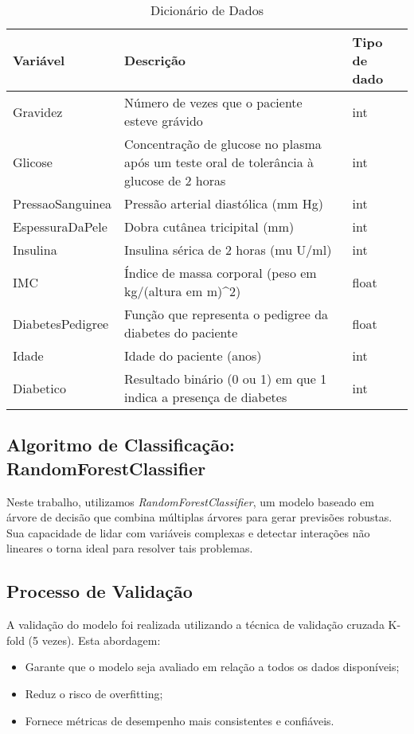 \documentclass[a4paper,12pt]{article}
\begin{document}
\begin{table}[H]
    \centering
    \caption{Dicionário de Dados}
    \begin{tabular}{|p{3cm}|p{7cm}|p{3cm}|}
        \hline
        \textbf{Variável} & \textbf{Descrição} & \textbf{Tipo de dado} \\
        \hline
        Gravidez & Número de vezes que o paciente esteve grávido & int \\
        \hline
        Glicose & Concentração de glucose no plasma após um teste oral de tolerância à glucose de 2 horas & int \\
        \hline
        PressaoSanguinea & Pressão arterial diastólica (mm Hg) & int \\
        \hline
        EspessuraDaPele & Dobra cutânea tricipital (mm) & int \\
        \hline
        Insulina & Insulina sérica de 2 horas (mu U/ml) & int \\
        \hline
        IMC & Índice de massa corporal (peso em kg/(altura em m)^2) & float \\
        \hline
        DiabetesPedigree & Função que representa o pedigree da diabetes do paciente & float \\
        \hline
        Idade & Idade do paciente (anos) & int \\
        \hline
        Diabetico & Resultado binário (0 ou 1) em que 1 indica a presença de diabetes & int \\
        \hline
    \end{tabular}
\end{table}

\subsection{Algoritmo de Classificação: RandomForestClassifier}
Neste trabalho, utilizamos \textit{RandomForestClassifier}, um modelo baseado em árvore de decisão que combina múltiplas árvores para gerar previsões robustas. Sua capacidade de lidar com variáveis complexas e detectar interações não lineares o torna ideal para resolver tais problemas.

\subsection{Processo de Validação}
A validação do modelo foi realizada utilizando a técnica de validação cruzada K-fold (5 vezes). Esta abordagem:
\begin{itemize}
    \item Garante que o modelo seja avaliado em relação a todos os dados disponíveis;
    \item Reduz o risco de overfitting;
    \item Fornece métricas de desempenho mais consistentes e confiáveis.
\end{itemize}
\end{document}
